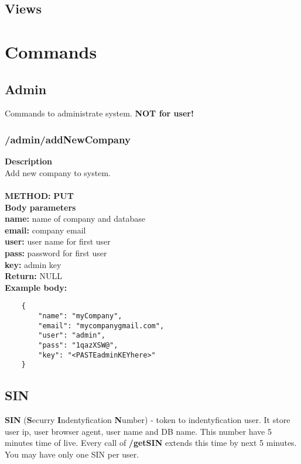 \documentclass[a4paper, 12pt]{report}
\begin{document}
\section{Views}
\chapter{Commands}
\section{Admin}
Commands to administrate system. \textbf{NOT for user!}

\subsection{/admin/addNewCompany}


\textbf{\color{redText} Description} \\
Add new company to system. \\ \\
\textbf{\color{redText} METHOD: } \textbf{PUT} \\
\textbf{\color{redText} Body parameters} \\
\textbf{name: } name of company and database \\
\textbf{email: } company email \\
\textbf{user: } user name for first user \\
\textbf{pass: } password for first user \\
\textbf{key: } admin key \\
\textbf{\color{redText} Return: } NULL \\
\textbf{\color{redText} Example body: }
\begin{lstlisting}
    {
        "name": "myCompany",
        "email": "mycompanygmail.com",
        "user": "admin",
        "pass": "1qazXSW@",
        "key": "<PASTEadminKEYhere>"
    }
\end{lstlisting}

\section{SIN}
\textbf{SIN} (\textbf{S}ecurry \textbf{I}ndentyfication \textbf{N}umber) - token to indentyfication user. It store user ip, user browser agent, user name and DB name.
This number have 5 minutes time of live. Every call of \textbf{/getSIN} extends this time by next 5 minutes.
You may have only one SIN per user.
\end{document}
